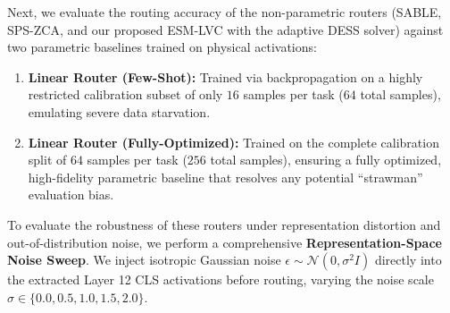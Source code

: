 Next, we evaluate the routing accuracy of the non-parametric routers (SABLE, SPS-ZCA, and our proposed ESM-LVC with the adaptive DESS solver) against two parametric baselines trained on physical activations:
\begin{enumerate}
    \item \textbf{Linear Router (Few-Shot):} Trained via backpropagation on a highly restricted calibration subset of only $16$ samples per task ($64$ total samples), emulating severe data starvation.
    \item \textbf{Linear Router (Fully-Optimized):} Trained on the complete calibration split of $64$ samples per task ($256$ total samples), ensuring a fully optimized, high-fidelity parametric baseline that resolves any potential ``strawman'' evaluation bias.
\end{enumerate}

To evaluate the robustness of these routers under representation distortion and out-of-distribution noise, we perform a comprehensive \textbf{Representation-Space Noise Sweep}. We inject isotropic Gaussian noise $\epsilon \sim \mathcal{N}(0, \sigma^2 I)$ directly into the extracted Layer 12 CLS activations before routing, varying the noise scale $\sigma \in \{0.0, 0.5, 1.0, 1.5, 2.0\}$. 

